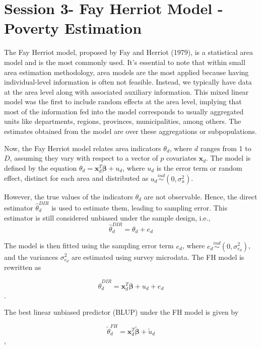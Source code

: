 \documentclass[
  12pt,
]{book}
\begin{document}
\hypertarget{session-3--fay-herriot-model---poverty-estimation}{%
\chapter{Session 3- Fay Herriot Model - Poverty Estimation}\label{session-3--fay-herriot-model---poverty-estimation}}

The Fay Herriot model, proposed by Fay and Herriot (1979), is a statistical area model and is the most commonly used. It's essential to note that within small area estimation methodology, area models are the most applied because having individual-level information is often not feasible. Instead, we typically have data at the area level along with associated auxiliary information. This mixed linear model was the first to include random effects at the area level, implying that most of the information fed into the model corresponds to usually aggregated units like departments, regions, provinces, municipalities, among others. The estimates obtained from the model are over these aggregations or subpopulations.

Now, the Fay Herriot model relates area indicators \(\theta_d\), where \(d\) ranges from 1 to \(D\), assuming they vary with respect to a vector of \(p\) covariates \(\boldsymbol{x}_d\). The model is defined by the equation \(\theta_d = \boldsymbol{x}^{T}_{d}\boldsymbol{\beta} + u_d\), where \(u_d\) is the error term or random effect, distinct for each area and distributed as \(u_{d} \stackrel{ind}{\sim}\left(0,\sigma_{u}^{2}\right)\).

However, the true values of the indicators \(\theta_d\) are not observable. Hence, the direct estimator \(\hat{\theta}^{DIR}_d\) is used to estimate them, leading to sampling error. This estimator is still considered unbiased under the sample design, i.e.,
\[
\hat{\theta}_d^{DIR} = \theta_d + e_d  
\]

The model is then fitted using the sampling error term \(e_d\), where \(e_{d} \stackrel{ind}{\sim} \left(0,\sigma^2_{e_d}\right)\), and the variances \(\sigma^2_{e_d}\) are estimated using survey microdata. The FH model is rewritten as

\[
\hat{\theta}^{DIR}_{d} = \boldsymbol{x}^{T}_{d}\boldsymbol{\beta} + u_d + e_d
\].

The best linear unbiased predictor (BLUP) under the FH model is given by

\[
\tilde{\theta}_{d}^{FH} = \boldsymbol{x}^{T}_{d}\tilde{\boldsymbol{\beta}}+\tilde{u}_{d}
\],
\end{document}
